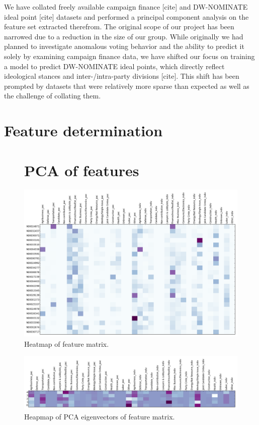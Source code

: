\documentclass[10]{article}
\begin{document}
We have collated freely available campaign finance [cite] and DW-NOMINATE ideal point [cite] datasets and performed a principal component analysis on the feature set extracted therefrom. The original scope of our project has been narrowed due to a reduction in the size of our group. While originally we had planned to investigate anomalous voting behavior and the ability to predict it solely by examining campaign finance data, we have shifted our focus on training a model to predict DW-NOMINATE ideal points, which directly reflect ideological stances and inter-/intra-party divisions [cite]. This shift has been prompted by datasets that were relatively more sparse than expected as well as the challenge of collating them.\\

\section*{Feature determination}

\begin{figure}[H]
\section*{PCA of features}
\centering
\includegraphics[width=.9\textwidth]{../../data/features/visualize/mod_2014_fm.png}
\caption{\label{fig:fmtrx}Heatmap of feature matrix.}
\end{figure}

\begin{figure}[H]
\centering
\includegraphics[width=.9\textwidth]{../../data/features/visualize/pcs.png}
\caption{\label{fig:fmtrx}Heapmap of PCA eigenvectors of feature matrix.}
\end{figure}
\end{document}
